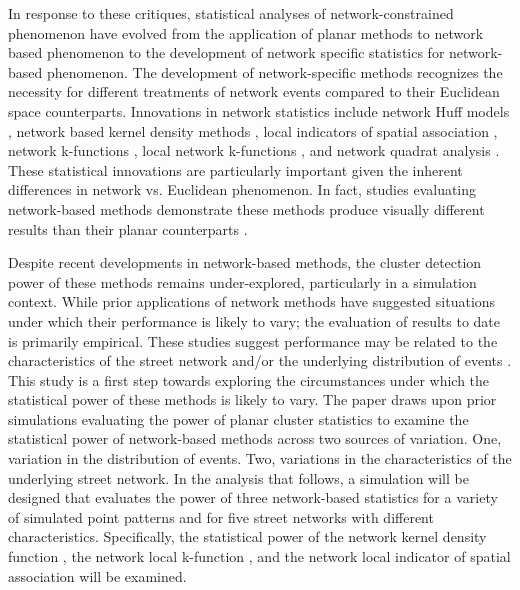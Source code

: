 \documentclass[12pt, letterpaper]{article}
\begin{document}
In response to these critiques, statistical analyses of network-constrained phenomenon have evolved from the application of planar methods to network based phenomenon \citep{black1991highway, levine1995spatial, miller1994market, okabekitamura1996,kwan1998space,blackthomas1998, okabe2001computational} to the development of network specific statistics for network-based phenomenon. The development of network-specific methods recognizes the necessity for different treatments of network events compared to their Euclidean space counterparts. Innovations in network statistics include network Huff models \citep{miller1994market, okabekitamura1996, okabe2001computational}, network based kernel density methods  \citep{porta2009street, borruso2008network, xie2008kernel, okabe2009kernel}, local indicators of spatial association \citep{yamada2010local}, network k-functions \citep{okabeyamada2001, luchen2007false}, local network k-functions \citep{yamada2007local}, and network quadrat analysis \citep{shiode2008analysis}. These statistical innovations are particularly important given the inherent differences in network vs. Euclidean phenomenon. In fact, studies evaluating network-based methods demonstrate these methods produce visually different results than their planar counterparts \citep{yamada2004comparison, cheng2005experimental, downs2007characterising}.  

Despite recent developments in network-based methods, the cluster detection power of these methods remains under-explored, particularly in a simulation context. While prior applications of network methods have suggested situations under which their performance is likely to vary; the evaluation of results to date is primarily empirical. These studies suggest performance may be related to the characteristics of the street network and/or the underlying distribution of events \citep{yamada2004comparison, luchen2007false, borruso2008network}. This study is a first step towards exploring the circumstances under which the statistical power of these methods is likely to vary. %
The paper draws upon prior simulations evaluating the power of planar cluster statistics to examine the statistical power of network-based methods across two sources of variation. One, variation in the distribution of events. Two, variations in the characteristics of the underlying street network. In the analysis that follows, a simulation will be designed that evaluates the power of three network-based statistics for a variety of simulated point patterns and for five street networks with different characteristics. Specifically, the statistical power of the network kernel density function \citep{okabe2009kernel}, the network local k-function \citep{yamada2007local}, and the network local indicator of spatial association \citep{yamada2010local} will be examined. 
\end{document}

